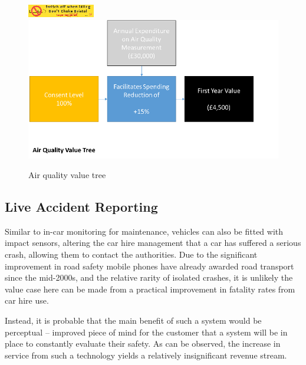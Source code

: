 \documentclass[conference]{IEEEtran}
\begin{document}
\begin{figure}[!htp]
\centering
\includegraphics[width=\columnwidth]{images/dontchokebristol.png}
\includegraphics[width=\columnwidth]{images/airqualityvt.png}
\caption{Air quality value tree}
\label{fig:airqualityvt}
\end{figure}

\subsection{Live Accident Reporting}

Similar to in-car monitoring for maintenance, vehicles can also be
fitted with impact sensors, altering the car hire management that a
car has suffered a serious crash, allowing them to contact the
authorities.  Due to the significant improvement in road safety mobile
phones have already awarded road transport since the mid-2000s, and
the relative rarity of isolated crashes, it is unlikely the value case
here can be made from a practical improvement in fatality rates from
car hire use.

Instead, it is probable that the main benefit of such a system would
be perceptual – improved piece of mind for the customer that a system
will be in place to constantly evaluate their safety.  As can be
observed, the increase in service from such a technology yields a
relatively insignificant revenue stream.
\end{document}
